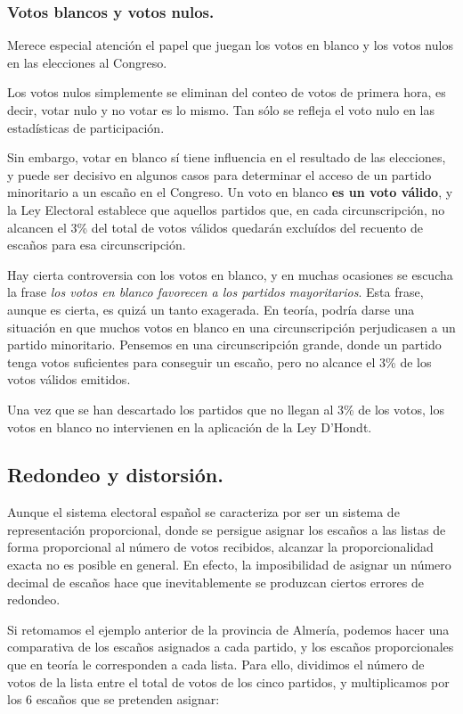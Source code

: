 \documentclass[11pt]{article}
\begin{document}
	
	\subsubsection{Votos blancos y votos nulos.}
	
	Merece especial atención el papel que juegan los votos en blanco y los votos nulos en las elecciones al Congreso.
	
	Los votos nulos simplemente se eliminan del conteo de votos de primera hora, es decir, votar nulo y no votar es lo mismo. Tan sólo se refleja el voto nulo en las estadísticas de participación.
	
	Sin embargo, votar en blanco sí tiene influencia en el resultado de las elecciones, y puede ser decisivo en algunos casos para determinar el acceso de un partido minoritario a un escaño en el Congreso. Un voto en blanco \textbf{es un voto válido}, y la Ley Electoral establece que aquellos partidos que, en cada circunscripción, no alcancen el 3\% del total de votos válidos quedarán excluídos del recuento de escaños para esa circunscripción.
	
	Hay cierta controversia con los votos en blanco, y en muchas ocasiones se escucha la frase \textit{los votos en blanco favorecen a los partidos mayoritarios}. Esta frase, aunque es cierta, es quizá un tanto exagerada. En teoría, podría darse una situación en que muchos votos en blanco en una circunscripción perjudicasen a un partido minoritario. Pensemos en una circunscripción grande, donde un partido tenga votos suficientes para conseguir un escaño, pero no alcance el 3\% de los votos válidos emitidos.
	
	Una vez que se han descartado los partidos que no llegan al 3\% de los votos, los votos en blanco no intervienen en la aplicación de la Ley D'Hondt.
	
	\subsection{Redondeo y distorsión.}
	
	Aunque el sistema electoral español se caracteriza por ser un sistema de representación proporcional, donde se persigue asignar los escaños a las listas de forma proporcional al número de votos recibidos, alcanzar la proporcionalidad exacta no es posible en general. En efecto, la imposibilidad de asignar un número decimal de escaños hace que inevitablemente se produzcan ciertos errores de redondeo.
	
	 Si retomamos el ejemplo anterior de la provincia de Almería, podemos hacer una comparativa de los escaños asignados a cada partido, y los escaños proporcionales que en teoría le corresponden a cada lista. Para ello, dividimos el número de votos de la lista entre el total de votos de los cinco partidos, y multiplicamos por los 6 escaños que se pretenden asignar:
	 
\end{document}
